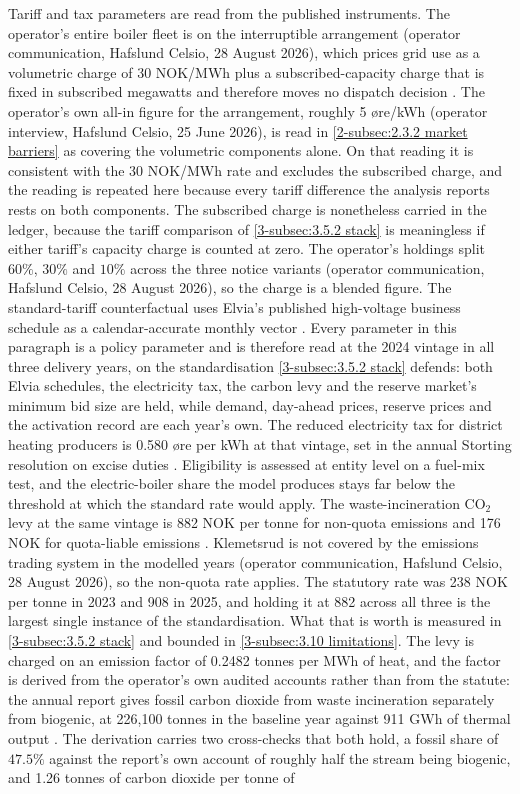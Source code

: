 Tariff and tax parameters are read from the published instruments. The operator's entire boiler fleet is on the interruptible arrangement (operator communication, Hafslund Celsio, 28 August 2026), which prices grid use as a volumetric charge of 30 NOK/MWh plus a subscribed-capacity charge that is fixed in subscribed megawatts and therefore moves no dispatch decision \cite{elvia_dagens_2022}. The operator's own all-in figure for the arrangement, roughly 5 øre/kWh (operator interview, Hafslund Celsio, 25 June 2026), is read in \autoref{2-subsec:2.3.2 market barriers} as covering the volumetric components alone. On that reading it is consistent with the 30 NOK/MWh rate and excludes the subscribed charge, and the reading is repeated here because every tariff difference the analysis reports rests on both components. The subscribed charge is nonetheless carried in the ledger, because the tariff comparison of \autoref{3-subsec:3.5.2 stack} is meaningless if either tariff's capacity charge is counted at zero. The operator's holdings split $60\%$, $30\%$ and $10\%$ across the three notice variants (operator communication, Hafslund Celsio, 28 August 2026), so the charge is a blended figure. The standard-tariff counterfactual uses Elvia's published high-voltage business schedule as a calendar-accurate monthly vector \cite{elvia_dagens_2022}. Every parameter in this paragraph is a policy parameter and is therefore read at the 2024 vintage in all three delivery years, on the standardisation \autoref{3-subsec:3.5.2 stack} defends: both Elvia schedules, the electricity tax, the carbon levy and the reserve market's minimum bid size are held, while demand, day-ahead prices, reserve prices and the activation record are each year's own. The reduced electricity tax for district heating producers is 0.580 øre per kWh at that vintage, set in the annual Storting resolution on excise duties \cite{stortinget_stortingsvedtak_nodate}. Eligibility is assessed at entity level on a fuel-mix test, and the electric-boiler share the model produces stays far below the threshold at which the standard rate would apply. The waste-incineration CO$_2$ levy at the same vintage is 882 NOK per tonne for non-quota emissions and 176 NOK for quota-liable emissions \cite{stortinget_stortingsvedtak_nodate}. Klemetsrud is not covered by the emissions trading system in the modelled years (operator communication, Hafslund Celsio, 28 August 2026), so the non-quota rate applies. The statutory rate was 238 NOK per tonne in 2023 and 908 in 2025, and holding it at 882 across all three is the largest single instance of the standardisation. What that is worth is measured in \autoref{3-subsec:3.5.2 stack} and bounded in \autoref{3-subsec:3.10 limitations}. The levy is charged on an emission factor of 0.2482 tonnes per MWh of heat, and the factor is derived from the operator's own audited accounts rather than from the statute: the annual report gives fossil carbon dioxide from waste incineration separately from biogenic, at 226{,}100 tonnes in the baseline year against 911 GWh of thermal output \cite{hafslund_arsrapport_nodate}. The derivation carries two cross-checks that both hold, a fossil share of $47.5\%$ against the report's own account of roughly half the stream being biogenic, and 1.26 tonnes of carbon dioxide per tonne of 